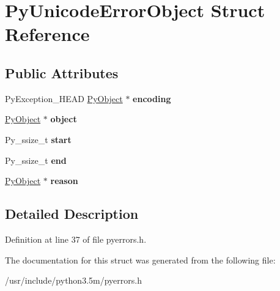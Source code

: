 \hypertarget{structPyUnicodeErrorObject}{}\section{Py\+Unicode\+Error\+Object Struct Reference}
\label{structPyUnicodeErrorObject}
\subsection*{Public Attributes}
\begin{DoxyCompactItemize}
\item 
Py\+Exception\+\_\+\+H\+E\+AD \hyperlink{struct__object}{Py\+Object} $\ast$ {\bfseries encoding}\hypertarget{structPyUnicodeErrorObject_a62191f79a51fdb37ce1351928bf44c19}{}\label{structPyUnicodeErrorObject_a62191f79a51fdb37ce1351928bf44c19}

\item 
\hyperlink{struct__object}{Py\+Object} $\ast$ {\bfseries object}\hypertarget{structPyUnicodeErrorObject_a7c7f8d33cacfb75d3383b6f1ad354e16}{}\label{structPyUnicodeErrorObject_a7c7f8d33cacfb75d3383b6f1ad354e16}

\item 
Py\+\_\+ssize\+\_\+t {\bfseries start}\hypertarget{structPyUnicodeErrorObject_a21a6e41da10c007992474a3577bf8ede}{}\label{structPyUnicodeErrorObject_a21a6e41da10c007992474a3577bf8ede}

\item 
Py\+\_\+ssize\+\_\+t {\bfseries end}\hypertarget{structPyUnicodeErrorObject_aa044eb7ce2644cb89b9fe9d431b9bce6}{}\label{structPyUnicodeErrorObject_aa044eb7ce2644cb89b9fe9d431b9bce6}

\item 
\hyperlink{struct__object}{Py\+Object} $\ast$ {\bfseries reason}\hypertarget{structPyUnicodeErrorObject_aebf54b5060cf56c47e5661a22bfcc4c3}{}\label{structPyUnicodeErrorObject_aebf54b5060cf56c47e5661a22bfcc4c3}

\end{DoxyCompactItemize}


\subsection{Detailed Description}


Definition at line 37 of file pyerrors.\+h.



The documentation for this struct was generated from the following file\+:\begin{DoxyCompactItemize}
\item 
/usr/include/python3.\+5m/pyerrors.\+h\end{DoxyCompactItemize}
